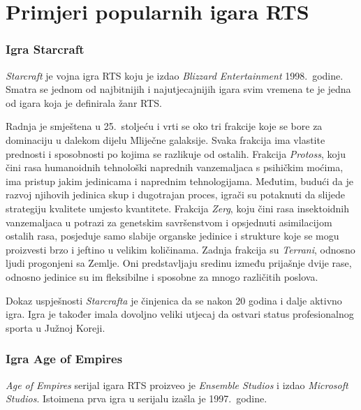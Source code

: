 \documentclass[times, utf8, zavrsni, numeric]{fer}
\begin{document}
\section{Primjeri popularnih igara RTS}

\subsubsection{Igra Starcraft}

\par \textit{Starcraft} je vojna igra RTS koju je izdao \textit{Blizzard Entertainment} 1998.\ godine. 
Smatra se jednom od najbitnijih i najutjecajnijih igara svim vremena te je jedna od igara koja je definirala žanr RTS.

\par Radnja je smještena u 25.\ stoljeću i vrti se oko tri frakcije koje se bore za dominaciju u dalekom dijelu Mliječne galaksije. 
Svaka frakcija ima vlastite prednosti i sposobnosti po kojima se razlikuje od ostalih. 
Frakcija \textit{Protoss}, koju čini rasa humanoidnih tehnološki naprednih vanzemaljaca s psihičkim moćima, ima pristup jakim jedinicama i naprednim tehnologijama.
Međutim, budući da je razvoj njihovih jedinica skup i dugotrajan proces, igrači su potaknuti da slijede strategiju kvalitete umjesto kvantitete.
Frakcija \textit{Zerg}, koju čini rasa insektoidnih vanzemaljaca u potrazi za genetskim savršenstvom i opsjednuti asimilacijom ostalih rasa, posjeduje samo slabije organske jedinice i strukture koje se mogu proizvesti brzo i jeftino u velikim količinama.
Zadnja frakcija su \textit{Terrani}, odnosno ljudi progonjeni sa Zemlje.
Oni predstavljaju sredinu između prijašnje dvije rase, odnosno jedinice su im fleksibilne i sposobne za mnogo različitih poslova.

\par Dokaz uspješnosti \textit{Starcrafta} je činjenica da se nakon 20 godina i dalje aktivno igra.
Igra je također imala dovoljno veliki utjecaj da ostvari status profesionalnog sporta u Južnoj Koreji.

\subsubsection{Igra Age of Empires}

\par \textit{Age of Empires} serijal igara RTS proizveo je \textit{Ensemble Studios} i izdao \textit{Microsoft Studios}. 
Istoimena prva igra u serijalu izašla je 1997.\ godine.
\end{document}
